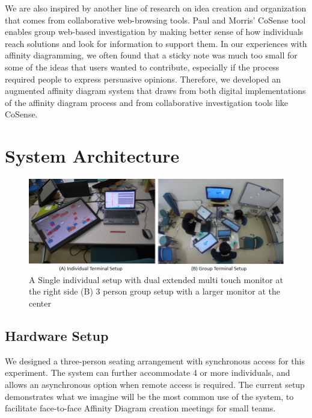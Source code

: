 \documentclass{sigchi}
\begin{document}
We are also inspired by another line of research on idea creation and organization that comes from collaborative web-browsing tools. Paul and Morris' CoSense tool enables group web-based investigation by making better sense of how individuals reach solutions and look for information to support them.\cite{Paul:2009:CES:1518701.1518974} In our experiences with affinity diagramming, we often found that a sticky note was much too small for some of the ideas that users wanted to contribute, especially if the process required people to express persuasive opinions. Therefore, we developed an augmented affinity diagram system that draws from both digital implementations of the affinity diagram process and from collaborative investigation tools like CoSense.


\section{System Architecture}
\begin{figure}
\centering
\includegraphics[width=1.9\columnwidth]{system}
\caption{{A} Single individual setup with dual extended multi touch monitor at the right side (B) 3 person group setup with a larger monitor at the center}
\label{fig:figure1}
\end{figure}

\subsection{Hardware Setup}

We designed a three-person seating arrangement with synchronous access for this experiment. The system can further accommodate 4 or more individuals, and allows an asynchronous option when remote access is required. The current setup demonstrates what we imagine will be the most common use of the system, to facilitate face-to-face Affinity Diagram creation meetings for small teams. 
\end{document}
